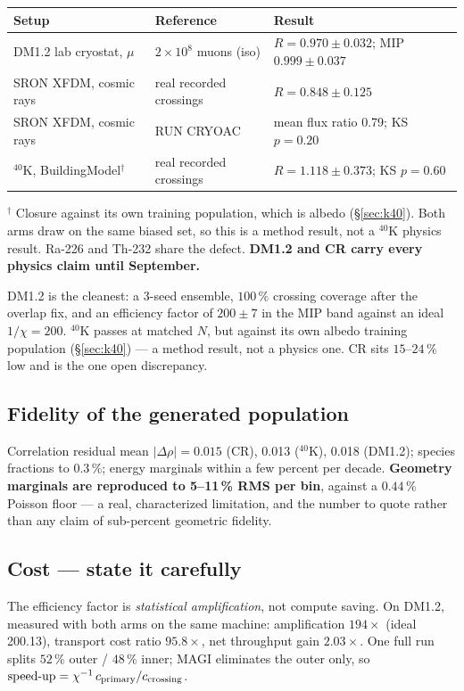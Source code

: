 \documentclass[11pt,a4paper]{article}
\begin{document}
\begin{center}
\begin{tabular}{lll}
\toprule
Setup & Reference & Result \\
\midrule
DM1.2 lab cryostat, $\mu$ & $2\times10^{8}$ muons (iso) & $R = 0.970 \pm 0.032$; MIP $0.999 \pm 0.037$ \\
SRON XFDM, cosmic rays & real recorded crossings & $R = 0.848 \pm 0.125$ \\
SRON XFDM, cosmic rays & RUN CRYOAC & mean flux ratio 0.79; KS $p = 0.20$ \\
$^{40}$K, BuildingModel$^{\dagger}$ & real recorded crossings & $R = 1.118 \pm 0.373$; KS $p = 0.60$ \\
\bottomrule
\end{tabular}
\end{center}

{\footnotesize $^{\dagger}$ Closure against its own training population, which
is albedo (\S\ref{sec:k40}). Both arms draw on the same biased set, so this is a
method result, not a $^{40}$K physics result. Ra-226 and Th-232 share the
defect. \textbf{DM1.2 and CR carry every physics claim until September.}}

DM1.2 is the cleanest: a 3-seed ensemble, $100\,\%$ crossing coverage after the
overlap fix, and an efficiency factor of $200 \pm 7$ in the MIP band against an
ideal $1/\chi = 200$. $^{40}$K passes at matched $N$, but against its own albedo training
population (\S\ref{sec:k40}) --- a method result, not a physics one. CR sits
$15$--$24\,\%$ low and is the one open discrepancy.

\subsection*{Fidelity of the generated population}

Correlation residual mean $|\Delta\rho| = 0.015$ (CR), 0.013 ($^{40}$K), 0.018
(DM1.2); species fractions to $0.3\,\%$; energy marginals within a few percent
per decade. \textbf{Geometry marginals are reproduced to 5--11\,\% RMS per bin},
against a $0.44\,\%$ Poisson floor --- a real, characterized limitation, and the
number to quote rather than any claim of sub-percent geometric fidelity.

\subsection*{Cost --- state it carefully}

The efficiency factor is \emph{statistical amplification}, not compute saving.
On DM1.2, measured with both arms on the same machine: amplification
$194\times$ (ideal 200.13), transport cost ratio $95.8\times$, net throughput
gain $\mathbf{2.03\times}$. One full run splits $52\,\%$ outer / $48\,\%$ inner;
MAGI eliminates the outer only, so
$\text{speed-up} = \chi^{-1}\,c_{\rm primary}/c_{\rm crossing}$.
\end{document}
